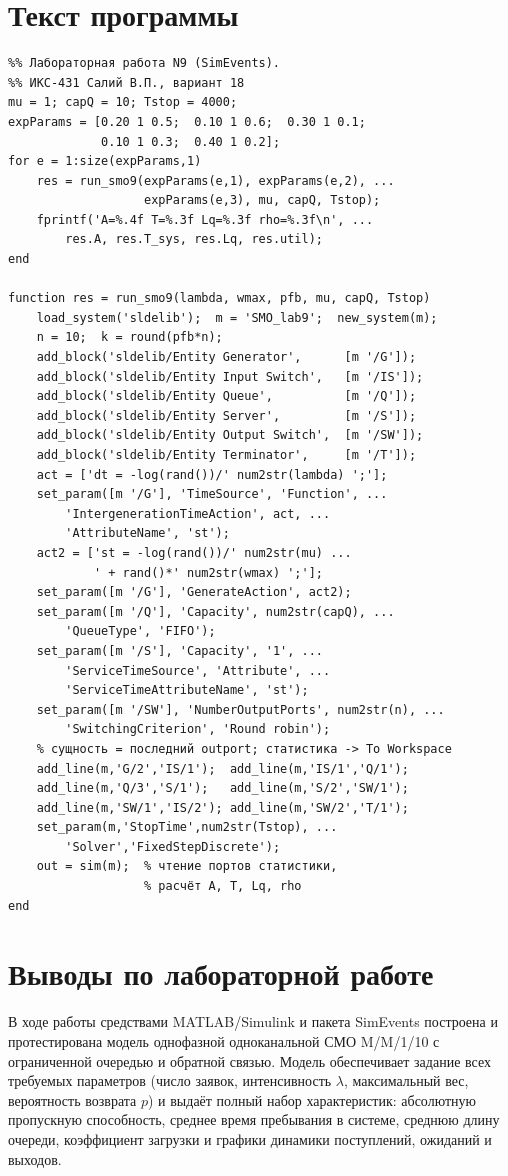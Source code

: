 \documentclass[a4paper,14pt,oneside,openany]{memoir}
\begin{document}
\section{Текст программы}
\begin{verbatim}
%% Лабораторная работа N9 (SimEvents).
%% ИКС-431 Салий В.П., вариант 18
mu = 1; capQ = 10; Tstop = 4000;
expParams = [0.20 1 0.5;  0.10 1 0.6;  0.30 1 0.1;
             0.10 1 0.3;  0.40 1 0.2];
for e = 1:size(expParams,1)
    res = run_smo9(expParams(e,1), expParams(e,2), ...
                   expParams(e,3), mu, capQ, Tstop);
    fprintf('A=%.4f T=%.3f Lq=%.3f rho=%.3f\n', ...
        res.A, res.T_sys, res.Lq, res.util);
end

function res = run_smo9(lambda, wmax, pfb, mu, capQ, Tstop)
    load_system('sldelib');  m = 'SMO_lab9';  new_system(m);
    n = 10;  k = round(pfb*n);
    add_block('sldelib/Entity Generator',      [m '/G']);
    add_block('sldelib/Entity Input Switch',   [m '/IS']);
    add_block('sldelib/Entity Queue',          [m '/Q']);
    add_block('sldelib/Entity Server',         [m '/S']);
    add_block('sldelib/Entity Output Switch',  [m '/SW']);
    add_block('sldelib/Entity Terminator',     [m '/T']);
    act = ['dt = -log(rand())/' num2str(lambda) ';'];
    set_param([m '/G'], 'TimeSource', 'Function', ...
        'IntergenerationTimeAction', act, ...
        'AttributeName', 'st');
    act2 = ['st = -log(rand())/' num2str(mu) ...
            ' + rand()*' num2str(wmax) ';'];
    set_param([m '/G'], 'GenerateAction', act2);
    set_param([m '/Q'], 'Capacity', num2str(capQ), ...
        'QueueType', 'FIFO');
    set_param([m '/S'], 'Capacity', '1', ...
        'ServiceTimeSource', 'Attribute', ...
        'ServiceTimeAttributeName', 'st');
    set_param([m '/SW'], 'NumberOutputPorts', num2str(n), ...
        'SwitchingCriterion', 'Round robin');
    % сущность = последний outport; статистика -> To Workspace
    add_line(m,'G/2','IS/1');  add_line(m,'IS/1','Q/1');
    add_line(m,'Q/3','S/1');   add_line(m,'S/2','SW/1');
    add_line(m,'SW/1','IS/2'); add_line(m,'SW/2','T/1');
    set_param(m,'StopTime',num2str(Tstop), ...
        'Solver','FixedStepDiscrete');
    out = sim(m);  % чтение портов статистики,
                   % расчёт A, T, Lq, rho
end
\end{verbatim}

\section*{Выводы по лабораторной работе}
В ходе работы средствами MATLAB/Simulink и пакета SimEvents построена и протестирована модель однофазной одноканальной СМО M/M/1/10 с ограниченной очередью и обратной связью. Модель обеспечивает задание всех требуемых параметров (число заявок, интенсивность $\lambda$, максимальный вес, вероятность возврата $p$) и выдаёт полный набор характеристик: абсолютную пропускную способность, среднее время пребывания в системе, среднюю длину очереди, коэффициент загрузки и графики динамики поступлений, ожиданий и выходов.
\end{document}

